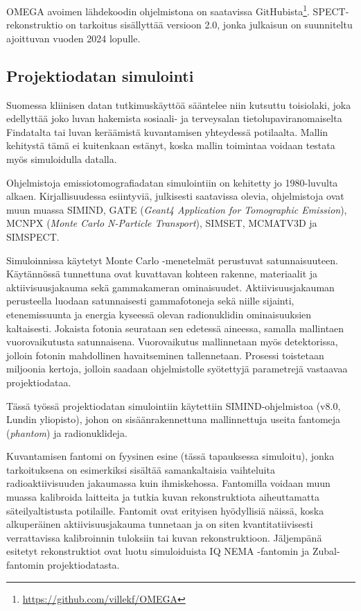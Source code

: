 OMEGA avoimen lähdekoodin ohjelmistona on saatavissa GitHubista\footnote{\url{https://github.com/villekf/OMEGA}}. SPECT-rekonstruktio on tarkoitus sisällyttää versioon 2.0, jonka julkaisun on suunniteltu ajoittuvan vuoden 2024 lopulle.

\subsection{Projektiodatan simulointi}
Suomessa kliinisen datan tutkimuskäyttöä sääntelee niin kutsuttu toisiolaki, joka edellyttää joko luvan hakemista sosiaali- ja terveysalan tietolupaviranomaiselta Findatalta tai luvan keräämistä kuvantamisen yhteydessä potilaalta. Mallin kehitystä tämä ei kuitenkaan estänyt, koska mallin toimintaa voidaan testata myös simuloidulla datalla.

Ohjelmistoja emissiotomografiadatan simulointiin on kehitetty jo 1980-luvulta alkaen\cite{ljungberg_monte_1989}. Kirjallisuudessa esiintyviä, julkisesti saatavissa olevia, ohjelmistoja ovat muun muassa SIMIND\cite{ljungberg_monte_1989, taheri_monte_2017, giannone_monte_1999}, GATE (\textit{Geant4 Application for Tomographic Emission})\cite{jan_gate_2004, taheri_monte_2017}, MCNPX (\textit{Monte Carlo N-Particle Transport})\cite{taheri_monte_2017}, SIMSET\cite{giannone_monte_1999}, MCMATV3D\cite{giannone_monte_1999} ja SIMSPECT\cite{giannone_monte_1999}.

Simuloinnissa käytetyt Monte Carlo -menetelmät perustuvat satunnaisuuteen. Käytännössä tunnettuna ovat kuvattavan kohteen rakenne, materiaalit ja aktiivisuusjakauma sekä gammakameran ominaisuudet. Aktiivisuusjakauman perusteella luodaan satunnaisesti gammafotoneja sekä niille sijainti, etenemissuunta ja energia kyseessä olevan radionuklidin ominaisuuksien kaltaisesti. Jokaista fotonia seurataan sen edetessä aineessa, samalla mallintaen vuorovaikutusta satunnaisena. Vuorovaikutus mallinnetaan myös detektorissa, jolloin fotonin mahdollinen havaitseminen tallennetaan. Prosessi toistetaan miljoonia kertoja, jolloin saadaan ohjelmistolle syötettyjä parametrejä vastaavaa projektiodataa.\cite{ljungberg_monte_1989}

Tässä työssä projektiodatan simulointiin käytettiin SIMIND-ohjelmistoa (v8.0, Lundin yliopisto)\cite{ljungberg_monte_1989}, johon on sisäänrakennettuna mallinnettuja useita fantomeja (\textit{phantom}) ja radionuklideja.

Kuvantamisen fantomi on fyysinen esine (tässä tapauksessa simuloitu), jonka tarkoituksena on esimerkiksi sisältää samankaltaisia vaihteluita radioaktiivisuuden jakaumassa kuin ihmiskehossa. Fantomilla voidaan muun muassa kalibroida laitteita ja tutkia kuvan rekonstruktiota aiheuttamatta säteilyaltistusta potilaille. Fantomit ovat erityisen hyödyllisiä näissä, koska alkuperäinen aktiivisuusjakauma tunnetaan ja on siten kvantitatiivisesti verrattavissa kalibroinnin tuloksiin tai kuvan rekonstruktioon. Jäljempänä esitetyt rekonstruktiot ovat luotu simuloiduista IQ NEMA -fantomin\cite{nema2018} ja Zubal-fantomin\cite{zubal_computerized_1994} projektiodatasta.

